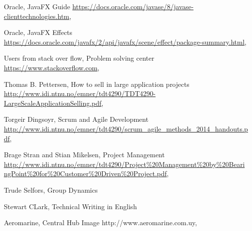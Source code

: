 \documentclass[../document]{subfiles}
\begin{document}
\begin{thebibliography}{1}
\label{Bibliography}


Oracle,
{JavaFX Guide}
\url{https://docs.oracle.com/javase/8/javase-clienttechnologies.htm},

Oracle,
{JavaFX Effects}
\url{https://docs.oracle.com/javafx/2/api/javafx/scene/effect/package-summary.html},

Users from stack over flow, 
{Problem solving center}
\url{https://www.stackoverflow.com},

Thomas B. Pettersen, 
{How to sell in large application projects}
\url{http://www.idi.ntnu.no/emner/tdt4290/TDT4290-LargeScaleApplicationSelling.pdf},

Torgeir Dingsoyr, 
{Scrum and Agile Development}
\url{http://www.idi.ntnu.no/emner/tdt4290/scrum_agile_methods_2014_handouts.pdf},

Brage Stran and Stian Mikelsen, 
{Project Management}
\url{http://www.idi.ntnu.no/emner/tdt4290/Project%20Management%20by%20BearingPoint%20for%20Customer%20Driven%20Project.pdf},

Trude Selfors, 
{Group Dynamics}

Stewart CLark, 
{Technical Writing in English}

Aeromarine,
{Central Hub Image}
http://www.aeromarine.com.uy,



\end{thebibliography}
\end{document}
